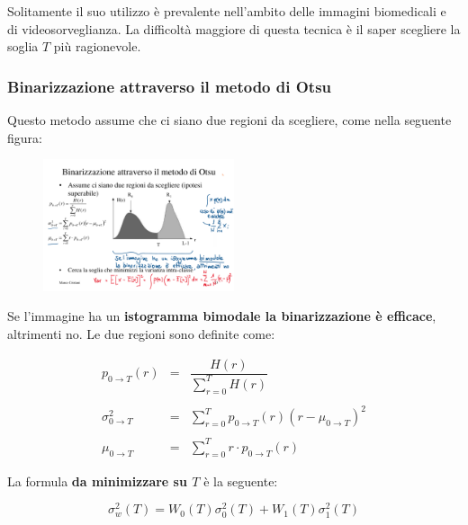 \documentclass[a4paper]{article}
\begin{document}
	\noindent
	Solitamente il suo utilizzo è prevalente nell'ambito delle immagini biomedicali e di videosorveglianza. La difficoltà maggiore di questa tecnica è il saper scegliere la soglia $T$ più ragionevole.
	
	\subsubsection{Binarizzazione attraverso il metodo di Otsu}
	
	Questo metodo assume che ci siano due regioni da scegliere, come nella seguente figura:
	
	\begin{figure}[!htp]
		\centering
		\includegraphics[width=0.5\textwidth]{img/binarizzazione_otsu.pdf}
	\end{figure}

	\noindent
	Se l'immagine ha un \textbf{istogramma bimodale la binarizzazione è efficace}, altrimenti no. Le due regioni sono definite come:
	
	\begin{equation*}
		\begin{array}{lll}
			p_{0 \rightarrow T}\left(r\right) & = & \dfrac{H\left(r\right)}{\displaystyle\sum_{r = 0}^{T} H\left(r\right)} \\
			&& \\
			\sigma_{0 \rightarrow T}^{2} & = & \displaystyle\sum_{r = 0}^{T} p_{0 \rightarrow T}\left(r\right)\left(r - \mu_{0 \rightarrow T}\right)^{2} \\
			&& \\
			\mu_{0 \rightarrow T} & = & \displaystyle\sum_{r = 0}^{T}r \cdot p_{0 \rightarrow T}\left(r\right)
		\end{array}
	\end{equation*}

	\noindent
	La formula \textbf{da minimizzare su $T$} è la seguente:
	
	\begin{equation*}
		\sigma_{w}^{2}\left(T\right) = W_{0}\left(T\right) \sigma_{0}^{2}\left(T\right) + W_{1}\left(T\right) \sigma_{1}^{2}\left(T\right)
	\end{equation*}
\end{document}

